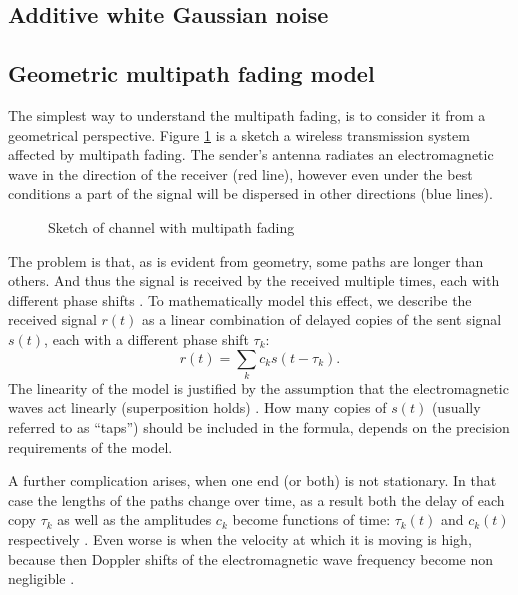 \subsection{Additive white Gaussian noise}


\subsection{Geometric multipath fading model}

The simplest way to understand the multipath fading, is to consider it from a geometrical perspective. Figure \ref{fig:multipath-sketch} is a sketch a wireless transmission system affected by multipath fading. The sender's antenna radiates an electromagnetic wave in the direction of the receiver (red line), however even under the best conditions a part of the signal will be dispersed in other directions (blue lines).

\begin{figure}
	\centering
	
	\caption{
		Sketch of channel with multipath fading
		\label{fig:multipath-sketch}
	}
\end{figure}

The problem is that, as is evident from geometry, some paths are longer than others. And thus the signal is received by the received multiple times, each with different phase shifts \cite{Gallager,Messier}. To mathematically model this effect, we describe the received signal \(r(t)\) as a linear combination of delayed copies of the sent signal \(s(t)\), each with a different phase shift \(\tau_k\):
\begin{equation} \label{eqn:geom-multipath-rx}
	r(t) = \sum_k c_k s(t - \tau_k).
\end{equation}
The linearity of the model is justified by the assumption that the electromagnetic waves act linearly (superposition holds) \cite{Gallager}. How many copies of \(s(t)\) (usually referred to as ``taps'') should be included in the formula, depends on the precision requirements of the model.

A further complication arises, when one end (or both) is not stationary. In that case the lengths of the paths change over time, as a result both the delay of each copy \(\tau_k\) as well as the amplitudes \(c_k\) become functions of time: \(\tau_k(t)\) and \(c_k(t)\) respectively \cite{Gallager,Messier}. Even worse is when the velocity at which it is moving is high, because then Doppler shifts of the electromagnetic wave frequency become non negligible \cite{Gallager}.

